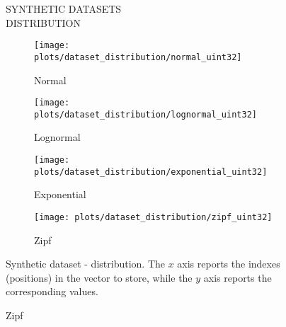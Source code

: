 \documentclass{article}
\begin{document}
\begin{figure}[!htbp]
\fbox
{
\begin{minipage}[t][0.98\textheight][t]{\textwidth}
\centering
    \vspace{20px}
    \begin{minipage}{0.95\linewidth}
    SYNTHETIC DATASETS \\ DISTRIBUTION
    \end{minipage}
    \vspace{20px}

   \begin{minipage}{0.49\linewidth}
        \begin{figure}[H]
        \texttt{[image: plots/dataset\_distribution/normal\_uint32]}
        \caption{Normal}
        \end{figure}
    \end{minipage}
    \begin{minipage}{0.49\linewidth}
        \begin{figure}[H]
            \texttt{[image: plots/dataset\_distribution/lognormal\_uint32]}
            \caption{Lognormal}
        \end{figure}
    \end{minipage}

    \vfill
    
    \begin{minipage}{0.49\linewidth}
        \begin{figure}[H]
        \texttt{[image: plots/dataset\_distribution/exponential\_uint32]}
        \caption{Exponential}
        \end{figure}
    \end{minipage}
    \begin{minipage}{0.49\linewidth}
        \begin{figure}[H]
            \texttt{[image: plots/dataset\_distribution/zipf\_uint32]}
            \caption{Zipf}
        \end{figure}
    \end{minipage}

    \vfill
    \centering
    \begin{minipage}{\linewidth}
        Synthetic dataset - distribution. The $x$ axis reports the indexes (positions) in the vector to store, while the $y$ axis reports the corresponding values.
    \end{minipage}
    \vspace{10px}
\end{minipage}
}
\end{figure}
\end{document}
